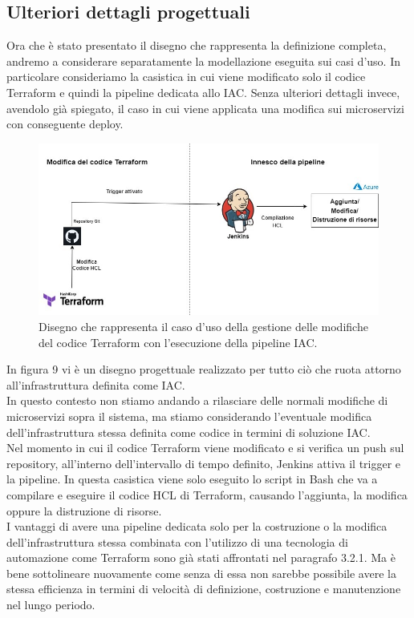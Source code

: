 \documentclass[a4paper,12pt]{report}
\begin{document}
\subsection{Ulteriori dettagli progettuali}
Ora che è stato presentato il disegno che rappresenta la definizione completa, andremo a considerare separatamente la modellazione eseguita sui casi d'uso. In particolare consideriamo la casistica in cui viene modificato solo il codice Terraform e quindi la pipeline dedicata allo IAC. Senza ulteriori dettagli invece, avendolo già spiegato, il caso in cui viene applicata una modifica sui microservizi con conseguente deploy. \\  
\begin{figure}[h]
	\includegraphics[width=1.0\textwidth]{modifica_terraform}
    \caption{Disegno che rappresenta il caso d'uso della gestione delle modifiche del codice Terraform con l'esecuzione della pipeline IAC.}
    \label{fig:modifica_terraform}
\end{figure} 
\newline In figura 9 vi è un disegno progettuale realizzato per tutto ciò che ruota attorno all'infrastruttura definita come IAC.\\
In questo contesto non stiamo andando a rilasciare delle normali modifiche di microservizi sopra il sistema, ma stiamo considerando l'eventuale modifica dell'infrastruttura stessa definita come codice in termini di soluzione IAC.\\
Nel momento in cui il codice Terraform viene modificato e si verifica un push sul repository, all'interno dell'intervallo di tempo definito, Jenkins attiva il trigger e la pipeline. In questa casistica viene solo eseguito lo script in Bash che va a compilare e eseguire il codice HCL di Terraform, causando l'aggiunta, la modifica oppure la distruzione di risorse.\\
I vantaggi di avere una pipeline dedicata solo per la costruzione o la modifica dell'infrastruttura stessa combinata con l'utilizzo di una tecnologia di automazione come Terraform sono già stati affrontati nel paragrafo 3.2.1. Ma è bene sottolineare nuovamente come senza di essa non sarebbe possibile avere la stessa efficienza in termini di velocità di definizione, costruzione e manutenzione nel lungo periodo.\\
\end{document}
